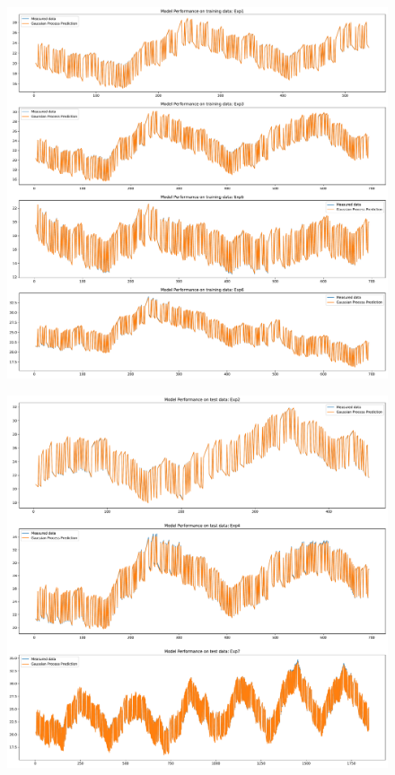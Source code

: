 \begin{figure}[ht]
    \centering
    \includegraphics[width = \textwidth]{Plots/SVGP_123_training_performance.pdf}
    \caption{}
    \label{fig:SVGP_train_validation}
\end{figure}

\begin{figure}[ht]
    \centering
    \includegraphics[width = \textwidth]{Plots/SVGP_123_test_performance.pdf}
    \caption{}
    \label{fig:SVGP_test_validation}
\end{figure}

\clearpage
